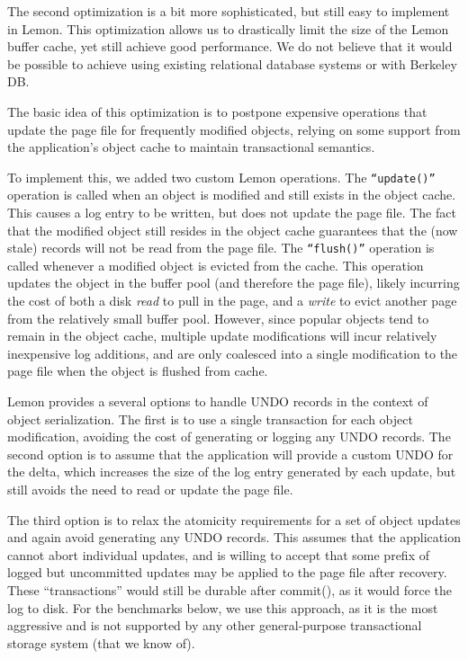 \documentclass[10pt,letterpaper,twocolumn,english]{article}
\newcommand{\yad}{Lemon\xspace}
\begin{document}

The second optimization is a bit more sophisticated, but still easy to
implement in \yad.  This optimization allows us to drastically limit
the size of the
\yad buffer cache, yet still achieve good performance.
We do not believe that it would be possible to
achieve using existing relational database systems or with Berkeley DB.  

The basic idea of this optimization is to postpone expensive
operations that update the page file for frequently modified objects,
relying on some support from the application's object cache
to maintain transactional semantics.

To implement this, we added two custom \yad operations. The
{\tt``update()''} operation is called when an object is modified and
still exists in the object cache. This causes a log entry to be
written, but does not update the page file. The fact that the modified
object still resides in the object cache guarantees that the (now stale)
records will not be read from the page file. The {\tt ``flush()''}
operation is called whenever a modified object is evicted from the
cache. This operation updates the object in the buffer pool (and
therefore the page file), likely incurring the cost of both a disk {\em
read} to pull in the page, and a {\em write} to evict another page
from the relatively small buffer pool.  However, since popular 
objects tend to remain in the object cache, multiple update
modifications will incur relatively inexpensive log additions,
and are only coalesced into a single modification to the page file
when the object is flushed from cache.

\yad provides a several options  to handle UNDO records in the context
of object serialization. The first is to use a single transaction for
each object modification, avoiding the cost of generating or logging
any UNDO records. The second option is to assume that the
application will provide a custom UNDO for the delta, 
which increases the size of the log entry generated by each update, 
but still avoids the need to read or update the page
file.

The third option is to relax the atomicity requirements for a set of
object updates and again avoid generating any UNDO records. This
assumes that the application cannot abort individual updates, 
and is willing to
accept that some prefix of logged but uncommitted updates may 
be applied to the page
file after recovery. These ``transactions'' would still be durable
after commit(), as it would force the log to disk. 
For the benchmarks below, we
use this approach, as it is the most aggressive and is
not supported by any other general-purpose transactional 
storage system (that we know of).
\end{document}
